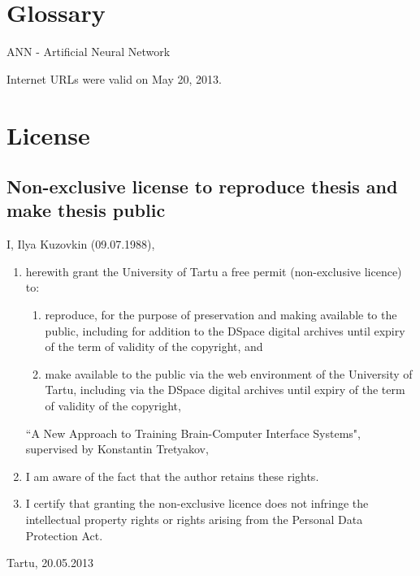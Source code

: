 \documentclass[a4paper,12pt]{report}
\theoremstyle{definition}
\begin{document}
\chapter*{Glossary}
ANN - Artificial Neural Network





Internet URLs were valid on May 20, 2013.
\newpage



\chapter*{License}


%
%
\section*{Non-exclusive license to reproduce thesis and make thesis public}
I, Ilya Kuzovkin (09.07.1988), 
\begin{enumerate}
	\item herewith grant the University of Tartu a free permit (non-exclusive licence) to:
	\begin{enumerate}[label*=\arabic*.]
		\renewcommand{\theenumi}{\arabic{enumi}}
		\item reproduce, for the purpose of preservation and making available to the public, including for addition to the DSpace digital archives until expiry of the term of validity of the copyright, and
		\item make available to the public via the web environment of the University of Tartu, including via the DSpace digital archives until expiry of the term of validity of the copyright,
	\end{enumerate}
	``A New Approach to Training Brain-Computer Interface Systems", supervised by Konstantin Tretyakov,
	
	\item I am aware of the fact that the author retains these rights.

	\item I certify that granting the non-exclusive licence does not infringe the intellectual property rights or rights arising from the Personal Data Protection Act. 
\end{enumerate}

Tartu, 20.05.2013

\thispagestyle{empty}
\newpage
\end{document}
